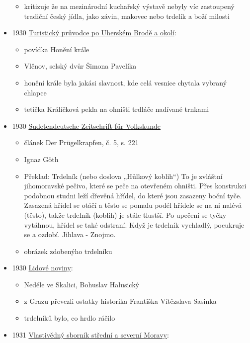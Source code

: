 \begin{itemize}
  \begin{itemize}
  \tightlist
  \item
    kritizuje že na mezinárodní kuchařský výstavě nebyly víc zastoupený
    tradiční český jídla, jako závin, makovec nebo trdelík a boží
    milosti
  \end{itemize}
\item
  1930
  \href{https://ceskadigitalniknihovna.cz/uuid/uuid:0ef229ae-ef9e-4c80-b6ca-8a7a99a85b67}{Turistický
  průvodce po Uherském Brodě a okolí}:

  \begin{itemize}
  \tightlist
  \item
    povídka Honění krále
  \item
    Vlčnov, selský dvůr Šimona Pavelíka
  \item
    honění krále byla jakási slavnost, kde celá vesnice chytala vybraný
    chlapce
  \item
    tetička Králíčková pekla na ohništi trdláče nadívané trnkami
  \end{itemize}
\item
  1930
  \href{https://ceskadigitalniknihovna.cz/uuid/uuid:c691a682-5723-11ee-b168-005056841fbb}{Sudetendeutsche
  Zeitschrift für Volkskunde}

  \begin{itemize}
  \tightlist
  \item
    článek Der Prügelkrapfen, č. 5, s. 221
  \item
    Ignaz Göth
  \item
    Překlad: Trdelník (nebo doslova „Hůlkový koblih``) To je zvláštní
    jihomoravské pečivo, které se peče na otevřeném ohništi. Přes
    konstrukci podobnou studni leží dřevěná hřídel, do které jsou
    zasazeny boční tyče. Zasazená hřídel se otáčí a těsto se pomalu
    podél hřídele se na ni nalévá (těsto), takže trdelník (koblih) je
    stále tlustší. Po upečení se tyčky vytáhnou, hřídel se také
    odstraní. Když je trdelník vychladlý, pocukruje se a ozdobí. Jihlava
    - Znojmo.
  \item
    obrázek zdobenýho trdelníku
  \end{itemize}
\item
  1930
  \href{https://ceskadigitalniknihovna.cz/uuid/uuid:af245650-9670-11dc-8c7e-000d606f5dc6}{Lidové
  noviny}:

  \begin{itemize}
  \tightlist
  \item
    Neděle ve Skalici, Bohuslav Halusický
  \item
    z Grazu převezli ostatky historika Františka Vítězslava Sasinka
  \item
    trdelníků bylo, co hrdlo ráčilo
  \end{itemize}
\item
  1931
  \href{https://www.digitalniknihovna.cz/vkol/uuid/uuid:c2c8f360-7588-407d-9bc7-d0c59adde597}{Vlastivědný
  sborník střední a severní Moravy}:


\end{itemize}

